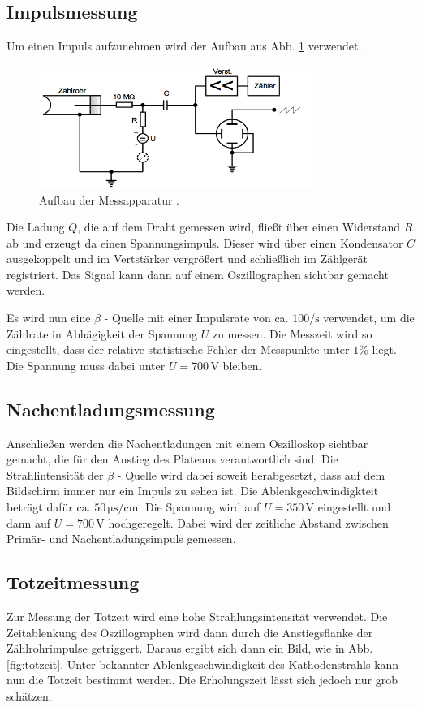 \subsection{Impulsmessung}
Um einen Impuls aufzunehmen wird der Aufbau aus Abb. \ref{fig:skizze} verwendet.
\begin{figure}
  \centering
  \includegraphics[width=0.8\textwidth]{bilder/skizze.png}
  \caption{Aufbau der Messapparatur \cite{703}.}
  \label{fig:skizze}
\end{figure}
Die Ladung $Q$, die auf dem Draht gemessen wird, fließt über einen Widerstand $R$
ab und erzeugt da einen Spannungsimpuls. Dieser wird über einen Kondensator $C$
ausgekoppelt und im Vertstärker vergrößert und schließlich im Zählgerät registriert.
Das Signal kann dann auf einem Oszillographen sichtbar gemacht werden.

Es wird nun eine $\beta$ - Quelle mit einer Impulsrate von ca. $100/\si{\second}$
verwendet, um die Zählrate in Abhägigkeit der Spannung $U$ zu messen. Die Messzeit
wird so eingestellt, dass der relative statistische Fehler
der Messpunkte unter $1 \%$ liegt. Die Spannung muss dabei unter $U  = 700 \,\si{\volt}$
bleiben.

\subsection{Nachentladungsmessung}
Anschließen werden die Nachentladungen mit einem Oszilloskop sichtbar gemacht, die
für den Anstieg des Plateaus verantwortlich sind. Die Strahlintensität der $\beta$ - Quelle
wird dabei soweit herabgesetzt, dass auf dem Bildschirm immer nur ein Impuls zu sehen ist.
Die Ablenkgeschwindigkteit beträgt dafür ca. $50 \,\si{\micro\second\per\centi\meter}$.
Die Spannung wird auf $U = 350\,\si{\volt}$ eingestellt und dann auf $U = 700\,\si{\volt}$
hochgeregelt. Dabei wird der zeitliche Abstand zwischen Primär- und Nachentladungsimpuls
gemessen.

\subsection{Totzeitmessung}
Zur Messung der Totzeit wird eine hohe Strahlungsintensität verwendet. Die Zeitablenkung
des Oszillographen wird dann durch die Anstiegsflanke der Zählrohrimpulse getriggert.
Daraus ergibt sich dann ein Bild, wie in Abb. \ref{fig:totzeit}. Unter bekannter
Ablenkgeschwindigkeit des Kathodenstrahls kann nun die Totzeit bestimmt werden.
Die Erholungszeit lässt sich jedoch nur grob schätzen.

